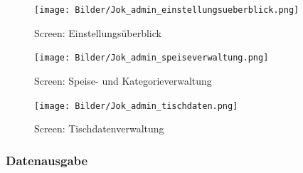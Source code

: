 			\begin{figure}[H]
			\begin{centering}
			\texttt{[image: Bilder/Jok\_admin\_einstellungsueberblick.png]}
			\par\end{centering}
			\caption{Screen: Einstellungsüberblick}
			\label{Screen: Einstellungsüberblick}
			\end{figure}  
			\begin{figure}[H]
			\begin{centering}
			\texttt{[image: Bilder/Jok\_admin\_speiseverwaltung.png]}
			\par\end{centering}
			\caption{Screen: Speise- und Kategorieverwaltung}
			\label{Screen: Speise- und Kategorieverwaltung}
			\end{figure}  
			\begin{figure}[H]
			\begin{centering}
			\texttt{[image: Bilder/Jok\_admin\_tischdaten.png]}
			\par\end{centering}
			\caption{Screen: Tischdatenverwaltung}
			\label{Screen: Tischdatenverwaltung}
			\end{figure}  				
    \subsubsection{Datenausgabe}

